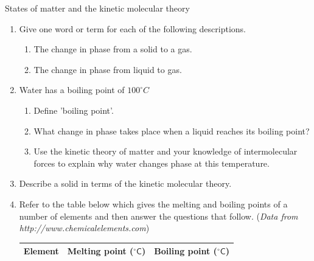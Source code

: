             \begin{eocexercises}{States of matter and the kinetic molecular theory}
            \nopagebreak \noindent
\label{m38730*id311490}\begin{enumerate}[noitemsep, label=\textbf{\arabic*}. ] 
            \label{m38730*uid87}\item Give one word or term for each of the following 
descriptions.
\label{m38730*id311506}\begin{enumerate}[noitemsep, label=\textbf{\alph*}. ] 
            \label{m38730*uid88}\item The change in phase from a solid to a gas.
\label{m38730*uid89}\item The change in phase from liquid to gas.
\end{enumerate}
                \label{m38730*uid103}\item Water has a boiling point of $100 ^{\circ} C$
\label{m38730*id311744}\begin{enumerate}[noitemsep, label=\textbf{\alph*}. ] 
            \label{m38730*uid104}\item Define 'boiling point'.
\label{m38730*uid105}\item What change in phase takes place when a liquid reaches 
its boiling point?
\label{m38730*uid107}\item Use the kinetic theory of matter and your knowledge of 
intermolecular forces to explain why water changes phase at this temperature.
\end{enumerate}
\label{m38730*id762}\item Describe a solid in terms of the kinetic molecular theory. \newline
            \label{m38730*uid108}\item Refer to the table below which gives the melting and 
boiling points of a number of elements and then answer the questions that follow. (\textsl{Data from http://www.chemicalelements.com})
          \begin{table}[H]
        \begin{center}
      \label{m38730*id311817}
      \begin{tabular}{|l|l|l|}\hline
\textbf{Element} & \textbf{Melting point ($^{\circ} \mathsf{C}$)} & \textbf{Boiling point ($^{\circ} \mathsf{C}$)} \\ \hline

\end{tabular}
\end{center}
\end{table}
\end{enumerate}
\end{eocexercises}
